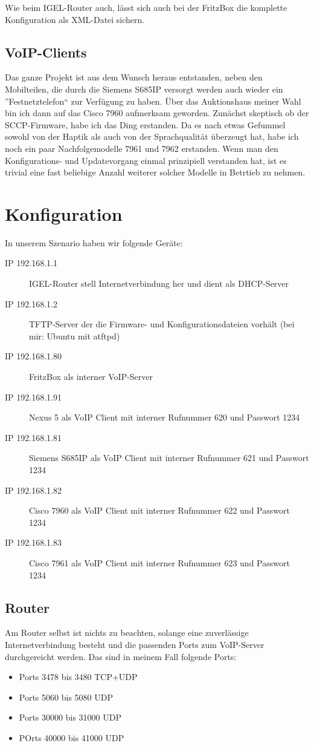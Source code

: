 \documentclass[a4paper,12pt]{scrbook}
\begin{document}
Wie beim IGEL-Router auch, lässt sich auch bei der FritzBox die komplette Konfiguration als XML-Datei sichern.


\section{VoIP-Clients}
Das ganze Projekt ist aus dem Wunsch heraus entstanden, neben den Mobilteilen, die durch die Siemens S685IP versorgt werden auch wieder ein
''Festnetztelefon`` zur Verfügung zu haben. Über das Auktionshaus meiner Wahl bin ich dann auf das Cisco 7960 aufmerksam geworden. Zunächst
skeptisch ob der SCCP-Firmware, habe ich das Ding erstanden. Da es nach etwas Gefummel sowohl von der Haptik als auch von der Sprachqualität 
überzeugt hat, habe ich noch ein paar Nachfolgemodelle 7961 und 7962 erstanden. Wenn man den Konfigurations- und Updatevorgang einmal prinzipiell
verstanden hat, ist es trivial eine fast beliebige Anzahl weiterer solcher Modelle in Betrtieb zu nehmen. 

\chapter{Konfiguration}
In unserem Szenario haben wir folgende Geräte:
\begin{description}
 \item[IP 192.168.1.1]  IGEL-Router stell Internetverbindung her und dient als DHCP-Server
 \item[IP 192.168.1.2]  TFTP-Server der die Firmware- und Konfigurationsdateien vorhält (bei mir: Ubuntu mit atftpd)
 \item[IP 192.168.1.80] FritzBox als interner VoIP-Server
 \item[IP 192.168.1.91] Nexus 5 als VoIP Client mit interner Rufnummer 620 und Passwort 1234
 \item[IP 192.168.1.81] Siemens S685IP als VoIP Client mit interner Rufnummer 621 und Passwort 1234
 \item[IP 192.168.1.82] Cisco 7960 als VoIP Client mit interner Rufnummer 622 und Passwort 1234
 \item[IP 192.168.1.83] Cisco 7961 als VoIP Client mit interner Rufnummer 623 und Passwort 1234
\end{description}

\section{Router}
Am Router selbst ist nichts zu beachten, solange eine zuverlässige Internetverbindung besteht und die passenden Ports zum VoIP-Server durchgereicht werden.
Das sind in meinem Fall folgende Ports:
\begin{itemize}
 \item Ports 3478 bis 3480 TCP+UDP
 \item Ports 5060 bis 5080 UDP
 \item Ports 30000 bis 31000 UDP
 \item POrts 40000 bis 41000 UDP
\end{itemize}
\end{document}
